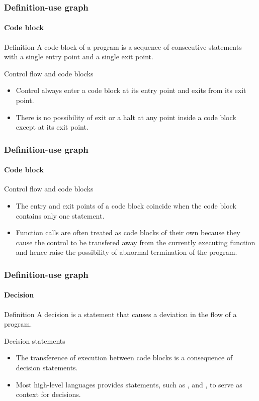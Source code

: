 \begin{frame}
\frametitle{Definition-use graph}
\framesubtitle{Code block}
\label{concept:statement}
\label{concept:statement-block}
\label{concept:code-block}

\begin{block:concept}{Definition}
A code block of a program is a sequence of consecutive statements with a single
entry point and a single exit point.
\end{block:concept}

\begin{block:fact}{Control flow and code blocks}
\begin{itemize}
	\item Control always enter a code block at its entry point and exits from
	its exit point.

	\item There is no possibility of exit or a halt at any point inside a code
	block except at its exit point.
\end{itemize}
\end{block:fact}
\end{frame}


\begin{frame}
\frametitle{Definition-use graph}
\framesubtitle{Code block}

\begin{block:fact}{Control flow and code blocks}
\begin{itemize}
	\item The entry and exit points of a code block coincide when the code
	block contains only one statement.

	\item Function calls are often treated as code blocks of their own because
	they cause the control to be transfered away from the currently executing
	function and hence raise the possibility of abnormal termination of the
	program.
\end{itemize}
\end{block:fact}
\end{frame}


\begin{frame}
\frametitle{Definition-use graph}
\framesubtitle{Decision}
\label{concept:definition}

\begin{block:concept}{Definition}
A decision is a statement that causes a deviation in the flow of a program.
\end{block:concept}

\begin{block:fact}{Decision statements}
\begin{itemize}
	\item The transference of execution between code blocks is a consequence of
	decision statements.

	\item Most high-level languages provides statements, such as ,
	 and , to serve as context for decisions.
\end{itemize}
\end{block:fact}
\end{frame}


